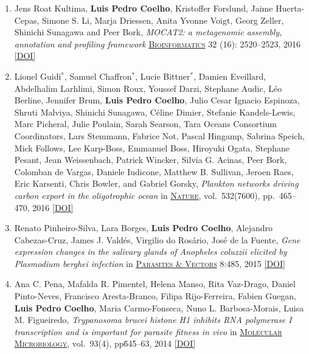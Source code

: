 \documentclass{article}
\newcommand\showdoi[1]{%
    \href{http://dx.doi.org/#1}{[DOI]}%
}
\newcommand\pubname[1]{\textsc{\uline{#1}}}
\newcommand\contribution[1]{\relax}
\newcommand\costar{${}^{*}$}
\begin{document}
\begin{enumerate}[resume]
\item Jens Roat Kultima, \textbf{Luis Pedro Coelho}, Kristoffer Forslund, Jaime
Huerta-Cepas, Simone S. Li, Marja Driessen, Anita Yvonne Voigt, Georg Zeller,
Shinichi Sunagawa and Peer Bork, \emph{MOCAT2: a metagenomic assembly,
annotation and profiling framework} \pubname{Bioinformatics} 32 (16):
2520--2523, 2016 \showdoi{10.1093/bioinformatics/btw183}
\contribution{I participated in the design and implementation of the proposed tool.}

\item Lionel Guidi\costar, Samuel Chaffron\costar, Lucie Bittner\costar,
Damien Eveillard, Abdelhalim Larhlimi, Simon Roux, Youssef Darzi, Stephane
Audic, Léo Berline, Jennifer Brum, \textbf{Luis Pedro Coelho}, Julio Cesar
Ignacio Espinoza, Shruti Malviya, Shinichi Sunagawa, Céline Dimier, Stefanie
Kandels-Lewis, Marc Picheral, Julie Poulain, Sarah Searson, Tara Oceans
Consortium Coordinators, Lars Stemmann, Fabrice Not, Pascal Hingamp, Sabrina
Speich, Mick Follows, Lee Karp-Boss, Emmanuel Boss, Hiroyuki Ogata, Stephane
Pesant, Jean Weissenbach, Patrick Wincker, Silvia G. Acinas, Peer Bork,
Colomban de Vargas, Daniele Iudicone, Matthew B. Sullivan, Jeroen Raes, Eric
Karsenti, Chris Bowler, and Gabriel Gorsky, \emph{Plankton networks driving
carbon export in the oligotrophic ocean} in \pubname{Nature}, vol.\ 532(7600),
pp.\ 465--470, 2016 \showdoi{10.1038/nature16942}
\contribution{I performed functional analysis of the metagenomics data.}

\item Renato Pinheiro-Silva, Lara Borges, \textbf{Luis Pedro Coelho}, Alejandro
Cabezas-Cruz, James J. Valdés, Virgilio do Rosário, José de la Fuente,
\emph{Gene expression changes in the salivary glands of Anopheles coluzzii
elicited by Plasmodium berghei infection} in \pubname{Parasites \& Vectors}
8:485, 2015 \showdoi{10.1186/s13071-015-1079-8}
\contribution{I supervised the first-author, who was, at the time a PhD
student, in the statistical analysis of the RNA-seq data.}


\item Ana C. Pena, Mafalda R. Pimentel, Helena Manso, Rita Vaz-Drago, Daniel
Pinto-Neves, Francisco Aresta-Branco, Filipa Rijo-Ferreira, Fabien Guegan,
\textbf{Luis Pedro Coelho}, Maria Carmo-Fonseca, Nuno L. Barbosa-Morais, Luisa
M. Figueiredo, \emph{Trypanosoma brucei histone H1 inhibits RNA polymerase I
transcription and is important for parasite fitness in vivo} in
\pubname{Molecular Microbiology}, vol.\ 93(4), pp\. 645--63, 2014
\showdoi{10.1111/mmi.12677}
\contribution{I supervised D.P-N., who was at the time, a bioinformatics MSc
student, in the statistical analysis of the RNA-seq data.}


\end{enumerate}
\end{document}
